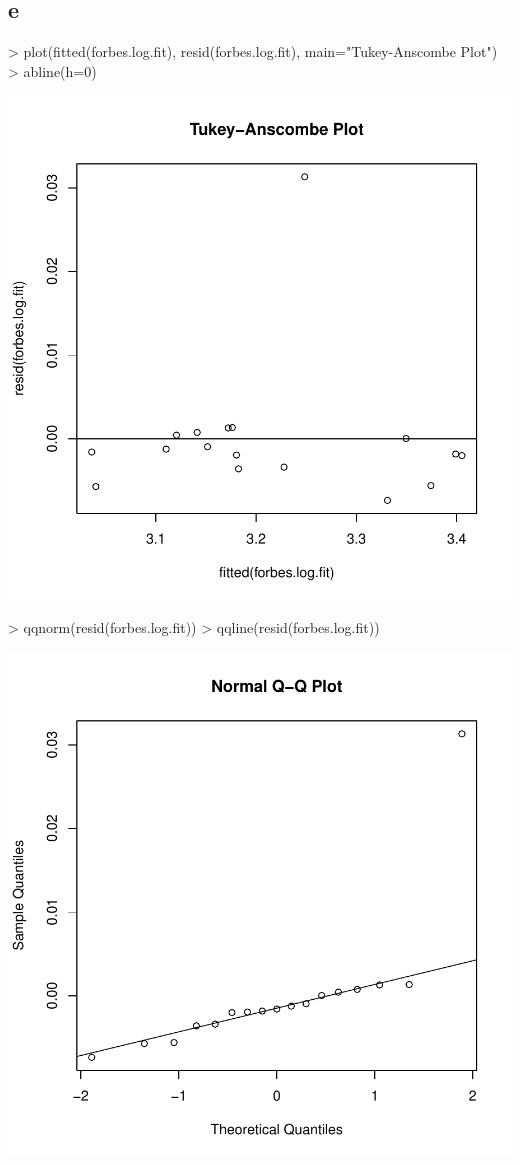\subsection{e}
\begin{Schunk}
\begin{Sinput}
> plot(fitted(forbes.log.fit), resid(forbes.log.fit), main="Tukey-Anscombe Plot")
> abline(h=0)
\end{Sinput}
\end{Schunk}
\includegraphics{sw12_1-006}
\begin{Schunk}
\begin{Sinput}
> qqnorm(resid(forbes.log.fit))
> qqline(resid(forbes.log.fit))
\end{Sinput}
\end{Schunk}
\includegraphics{sw12_1-007}

